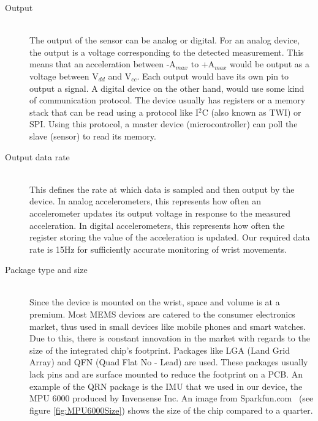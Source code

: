 \begin{description}

\item[Output] \hfill \\
The output of the sensor can be analog or digital. For an analog device, the output is a voltage corresponding to the detected measurement. This means that an acceleration between -A$_{max}$ to +A$_{max}$ would be output as a voltage between V$_{dd}$ and V$_{cc}$. Each output would have its own pin to output a signal. A digital device on the other hand, would use some kind of communication protocol. The device usually has registers or a memory stack that can be read using a protocol like I$^2$C (also known as TWI) or SPI. Using this protocol, a master device (microcontroller) can poll the slave (sensor) to read its memory.

\item[Output data rate] \hfill \\
This defines the rate at which data is sampled and then output by the device.
In analog accelerometers,
this represents how often an accelerometer updates its output voltage in response to the measured acceleration.
In digital accelerometers,
this represents how often the register storing the value of the acceleration is updated.
Our required data rate is 15Hz for sufficiently accurate monitoring of wrist movements.

\item[Package type and size] \hfill \\
Since the device is mounted on the wrist, space and volume is at a premium.
Most MEMS devices are catered to the consumer electronics market,
thus used in small devices like mobile phones and smart watches. Due to this,
there is constant innovation in the market with regards to the size of the integrated chip's footprint.
Packages like LGA (Land Grid Array) and QFN (Quad Flat No - Lead) are used.
These packages usually lack pins and are surface mounted to reduce the footprint on a PCB.
An example of the QRN package is the IMU that we used in our device, the MPU 6000 produced by Invensense Inc.
An image from Sparkfun.com~\cite{Image:SparkfunMPU6000}  (see figure \ref{fig:MPU6000Size}) shows the size of the chip compared to a quarter.


\end{description}
